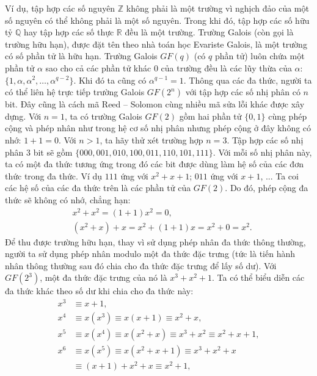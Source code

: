 \begin{multicols}{2}
	\vskip 0.05cm
	Ví dụ, tập hợp các số nguyên $\mathbb{Z}$ không phải là một trường vì nghịch đảo của một số nguyên có thể không phải là một số nguyên. Trong khi đó, tập hợp các số hữu tỷ $\mathbb{Q}$ hay tập hợp các số thực $\mathbb{R}$ đều là một trường.
	\vskip 0.05cm
	Trường Galois (còn gọi là trường hữu hạn), được đặt tên theo nhà toán học Evariste Galois, là một trường có số phần tử là hữu hạn. Trường Galois $GF(q)$ (có $q$ phần tử) luôn chứa một phần tử $\alpha$ sao cho cả các phần tử khác $0$ của trường đều là các lũy thừa của $\alpha$: $\{1,\alpha,\alpha^2,\ldots,\alpha^{q-2}\}$. Khi đó ta cũng có $\alpha^{q-1}=1$.
	\vskip 0.05cm
	Thông qua các đa thức, người ta có thể liên hệ trực tiếp trường Galois $GF(2^n)$ với tập hợp các số nhị phân có $n$ bit. Đây cũng là cách mã Reed -- Solomon cùng nhiều mã sửa lỗi khác được xây dựng.
	\vskip 0.05cm
	Với $n=1$, ta có trường Galois $GF(2)$ gồm hai phần tử $\{0,1\}$ cùng phép cộng và phép nhân như trong hệ cơ số nhị phân nhưng phép cộng ở đây không có nhớ: $1+1=0$.
	\vskip 0.05cm
	Với $n > 1$, ta hãy thử xét trường hợp $n=3$. Tập hợp các số nhị phân $3$ bit sẽ gồm $\{000, 001, 010, 100, 011, 110, 101, 111\}$. Với mỗi số nhị phân này, ta có một đa thức tương ứng trong đó các bit được dùng làm hệ số của các đơn thức trong đa thức. Ví dụ $111$ ứng với $x^2+x+1$; $011$ ứng với $x+1$, ...
	\vskip 0.05cm
	Ta coi các hệ số của các đa thức trên là các phần tử của $GF(2)$. Do đó, phép cộng đa thức sẽ không có nhớ, chẳng hạn:
	\begin{align*}
		&x^2+x^2=(1+1) x^2=0,\\
		&(x^2+x)+x=x^2+(1+1)x=x^2+0=x^2.
	\end{align*}
	Để thu được trường hữu hạn, thay vì sử dụng phép nhân đa thức thông thường, người ta sử dụng phép nhân modulo một đa thức đặc trưng (tức là tiến hành nhân thông thường sau đó chia cho đa thức đặc trưng để lấy số dư). Với $GF(2^3)$, một đa thức đặc trưng của nó là $x^3+x^2+1$. Ta có thể biểu diễn các đa thức khác theo số dư khi chia cho đa thức này:
	\begin{align*}
		x^3&\equiv x+1,\\[-0.5ex]
		x^4&\equiv x(x^3 )\equiv x(x+1)\equiv x^2+x,\\[-0.5ex]
		x^5&\equiv x(x^4 )\!\equiv \!x(x^2\!+\!x)\!\equiv\! x^3\!+\!x^2\!\equiv\! x^2\!+\!x\!+\!1,\\[-0.5ex]
		x^6&\equiv x(x^5 )\equiv x(x^2+x+1)\equiv x^3+x^2+x\\[-0.5ex]
		&\equiv(x+1)+x^2+x\equiv x^2+1,\\[-0.5ex]

\end{align*}
\end{multicols}

